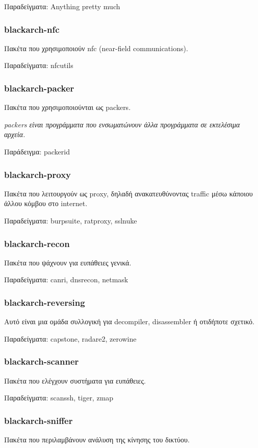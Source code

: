 \documentclass[a4paper, oneside, 11pt]{book}
\begin{document}
Παραδείγματα: Anything pretty much

\subsubsection{blackarch-nfc}
Πακέτα που χρησιμοποιούν nfc (near-field communications).

Παραδείγματα: nfcutils

\subsubsection{blackarch-packer}
Πακέτα που χρησιμοποιούνται ως packers.

\textit{packers είναι προγράμματα που ενσωματώνουν άλλα προγράμματα
σε εκτελέσιμα αρχεία.}

Παράδειγμα: packerid

\subsubsection{blackarch-proxy}
Πακέτα που λειτουργούν ως proxy, δηλαδή ανακατευθύνοντας traffic
μέσω κάποιου άλλου κόμβου στο internet.

Παραδείγματα: burpsuite, ratproxy, sslnuke

\subsubsection{blackarch-recon}
Πακέτα που ψάχνουν για ευπάθειες γενικά.

Παραδείγματα: canri, dnsrecon, netmask

\subsubsection{blackarch-reversing}
Αυτό είναι μια ομάδα συλλογική για decompiler,
disassembler ή οτιδήποτε σχετικό.

Παραδείγματα: capstone, radare2, zerowine

\subsubsection{blackarch-scanner}
Πακέτα που ελέγχουν συστήματα για ευπάθειες.

Παραδείγματα: scanssh, tiger, zmap

\subsubsection{blackarch-sniffer}
Πακέτα που περιλαμβάνουν ανάλυση της κίνησης του δικτύου.
\end{document}
